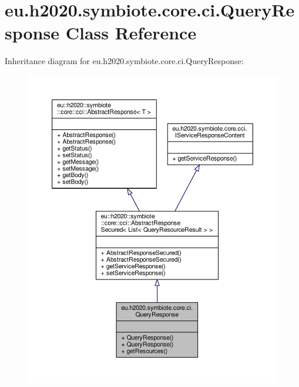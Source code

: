 \hypertarget{classeu_1_1h2020_1_1symbiote_1_1core_1_1ci_1_1QueryResponse}{}\section{eu.\+h2020.\+symbiote.\+core.\+ci.\+Query\+Response Class Reference}
\label{classeu_1_1h2020_1_1symbiote_1_1core_1_1ci_1_1QueryResponse}


Inheritance diagram for eu.\+h2020.\+symbiote.\+core.\+ci.\+Query\+Response\+:\nopagebreak
\begin{figure}[H]
\begin{center}
\leavevmode
\includegraphics[width=350pt]{classeu_1_1h2020_1_1symbiote_1_1core_1_1ci_1_1QueryResponse__inherit__graph}
\end{center}
\end{figure}


